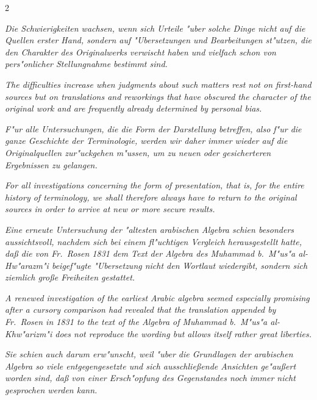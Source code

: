 \documentclass[10pt,a4paper]{article}
\begin{document}
\begin{paracol}{2}
\switchcolumn*

\textit{Die Schwierigkeiten wachsen, wenn sich Urteile "uber solche Dinge nicht auf die Quellen erster Hand, sondern auf "Ubersetzungen und Bearbeitungen st"utzen, die den Charakter des Originalwerks verwischt haben und vielfach schon von pers"onlicher Stellungnahme bestimmt sind.}

\switchcolumn

\textit{The difficulties increase when judgments about such matters rest not on first-hand sources but on translations and reworkings that have obscured the character of the original work and are frequently already determined by personal bias.}

\switchcolumn*

\textit{F"ur alle Untersuchungen, die die Form der Darstellung betreffen, also f"ur die ganze Geschichte der Terminologie, werden wir daher immer wieder auf die Originalquellen zur"uckgehen m"ussen, um zu neuen oder gesicherteren Ergebnissen zu gelangen.}

\switchcolumn

\textit{For all investigations concerning the form of presentation, that is, for the entire history of terminology, we shall therefore always have to return to the original sources in order to arrive at new or more secure results.}

\switchcolumn*

\textit{Eine erneute Untersuchung der "altesten arabischen Algebra schien besonders aussichtsvoll, nachdem sich bei einem fl"uchtigen Vergleich herausgestellt hatte, da\ss{} die von Fr.\ Rosen 1831 dem Text der Algebra des Muhammad b.\ M"us"a al-Hw"arazm"i beigef"ugte "Ubersetzung nicht den Wortlaut wiedergibt, sondern sich ziemlich gro\ss{}e Freiheiten gestattet.}

\switchcolumn

\textit{A renewed investigation of the earliest Arabic algebra seemed especially promising after a cursory comparison had revealed that the translation appended by Fr.\ Rosen in 1831 to the text of the Algebra of Muhammad b.\ M"us"a al-Khw"arizm"i does not reproduce the wording but allows itself rather great liberties.}

\switchcolumn*

\textit{Sie schien auch darum erw"unscht, weil "uber die Grundlagen der arabischen Algebra so viele entgegengesetzte und sich ausschlie\ss{}ende Ansichten ge"au\ss{}ert worden sind, da\ss{} von einer Ersch"opfung des Gegenstandes noch immer nicht gesprochen werden kann.}


\end{paracol}
\end{document}
